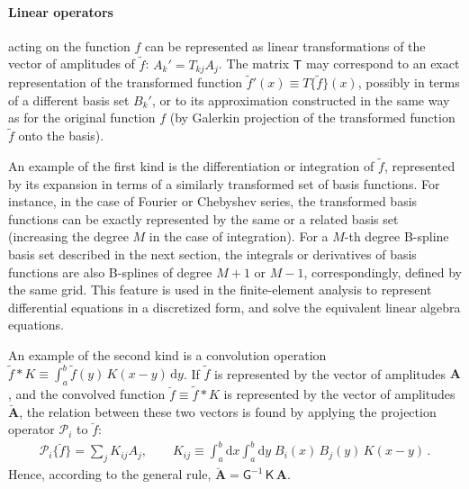 \documentclass[12pt]{article}
\renewcommand{\d}{\mathrm{d}}
\begin{document}
\paragraph{Linear operators} acting on the function $f$ can be represented as linear transformations of the vector of amplitudes of $\tilde f$: $A_k' = T_{kj} A_j$. The matrix $\mathsf T$ may correspond to an exact representation of the transformed function $\tilde f'(x) \equiv T\{\tilde f\}(x)$, possibly in terms of a different basis set $B_k'$, or to its approximation constructed in the same way as for the original function $f$ (by Galerkin projection of the transformed function $\tilde f$ onto the basis).

An example of the first kind is the differentiation or integration of $\tilde f$, represented by its expansion in terms of a similarly transformed set of basis functions. For instance, in the case of Fourier or Chebyshev series, the transformed basis functions can be exactly represented by the same or a related basis set (increasing the degree $M$ in the case of integration). For a $M$-th degree B-spline basis set described in the next section, the integrals or derivatives of basis functions are also B-splines of degree $M+1$ or $M-1$, correspondingly, defined by the same grid. This feature is used in the finite-element analysis to represent differential equations in a discretized form, and solve the equivalent linear algebra equations.

An example of the second kind is a convolution operation $\tilde f \ast K \equiv \int_a^b \tilde f(y)\, K(x-y)\, \d y$. If $\tilde f$ is represented by the vector of amplitudes $\boldsymbol A$, and the convolved function $\breve f \equiv \tilde f \ast K$ is represented by the vector of amplitudes $\boldsymbol{\breve A}$, the relation between these two vectors is found by applying the projection operator $\mathcal P_i$ to $\breve f$:
\begin{align}
\mathcal P_i \{ \breve f \} = \sum_j K_{ij} A_j, \qquad
K_{ij} \equiv \int_a^b \d x \int_a^b \d y\; B_i(x)\, B_j(y)\, K(x-y) \,.
\end{align}
Hence, according to the general rule, $\boldsymbol{\breve A} = \mathsf G^{-1} \, \mathsf K\, \boldsymbol A$.
\end{document}
